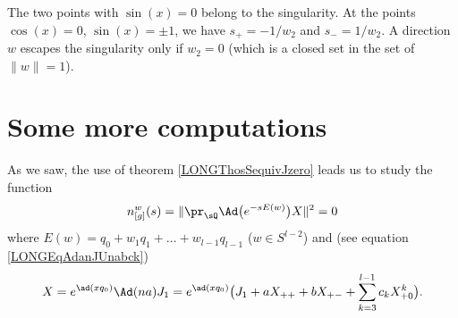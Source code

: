 The two points with $\sin(x)=0$ belong to the singularity. At the points $\cos(x)=0$, $\sin(x)=\pm1$, we have $s_+=-1/w_2$ and $s_-=1/w_2$. A direction $w$ escapes the singularity only if $w_2=0$ (which is a closed set in the set of $\| w \|=1$). 


\newcommand{\CaptionFigSFdgHdO}{Points in $\pi(K)$ are classified by their angle in $\SO(2)$. Red points are part of the singularity, points in the black zone belong to the black hole and points in the green zone are free. The upper and lower boundaries belong to the horizon.}



%
\section{Some more computations}
%
\label{LONGSecMoreComputations}

As we saw, the use of theorem \ref{LONGThosSequivJzero} leads us to study the function
\begin{equation}			\label{LONGEqprSqbignor}
	n_{[g]}^w(s)=\|   \pr_{\sQ} \Ad\big(  e^{-s E(w)} \big)X  \|^2=0
\end{equation}
where $E(w)=q_0+w_1q_1+\ldots+w_{l-1}q_{l-1}$ ($w\in S^{l-2}$) and (see equation \eqref{LONGEqAdanJUnabck})
\begin{equation}
	X=e^{\ad(xq_0)}\Ad(na)J_1=e^{\ad(xq_0)}\big(  J_1+aX_{++}+bX_{+-}+\sum_{k=3}^{l-1}c_kX_{+0}^k\big).
\end{equation}

